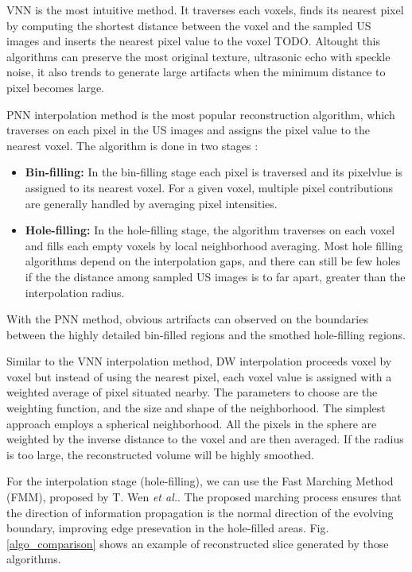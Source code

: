 \documentclass[12pt,journal,compsoc]{IEEEtran}
\begin{document}
VNN is the most intuitive method. It traverses each voxels, finds its nearest pixel by computing the shortest distance between the voxel and the sampled US images and inserts the nearest pixel value to the voxel TODO.
Altought this algorithms can preserve the most original texture, ultrasonic echo with speckle noise, it also trends to generate large artifacts when the minimum distance to pixel becomes large.\par

PNN interpolation method is the most popular reconstruction algorithm, which traverses on each pixel in the US images and assigns the pixel value to the nearest voxel.
The algorithm is done in two stages :
\begin{itemize}
	\item \textbf{Bin-filling:} In the bin-filling stage each pixel is traversed and its pixelvlue is assigned to its nearest voxel. For a given voxel, multiple pixel contributions are generally handled by averaging pixel intensities.  
	\item \textbf{Hole-filling:} In the hole-filling stage, the algorithm traverses on each voxel and fills each empty voxels by local neighborhood averaging. Most hole filling algorithms depend on the interpolation gaps, and there can still be few holes if the the distance among sampled US images is to far apart, greater than the interpolation radius. 
\end{itemize}
With the PNN method, obvious artrifacts can observed on the boundaries between the highly detailed bin-filled regions and the smothed hole-filling regions.\par

Similar to the VNN interpolation method, DW interpolation proceeds voxel by voxel but instead of using the nearest pixel, each voxel value is assigned with a weighted average of pixel situated nearby. The parameters to choose are the weighting function, and the size and shape of the neighborhood. The simplest approach employs a spherical neighborhood. All the pixels in the sphere are weighted by the inverse distance to the voxel and are then averaged. If the radius is too large, the reconstructed volume will be highly smoothed.

For the interpolation stage (hole-filling), we can use the Fast Marching Method (FMM), proposed by T. Wen \textit{et al.}\cite{2}. The proposed marching process ensures that the direction of information propagation is the normal direction of the evolving boundary, improving edge presevation in the hole-filled areas.
Fig.\ref{algo_comparison} shows an example of reconstructed slice generated by those algorithms.
\end{document}

